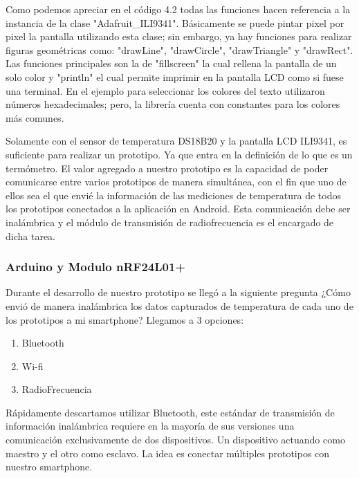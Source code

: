 \par \noindent
Como podemos apreciar en el código 4.2 todas las funciones hacen referencia a la instancia de la clase "Adafruit\_ILI9341". Básicamente se puede pintar pixel por pixel la pantalla utilizando esta clase; sin embargo, ya hay funciones para realizar figuras geométricas como: "drawLine", "drawCircle", "drawTriangle" y "drawRect". Las funciones principales  son la de "fillscreen" la cual rellena la pantalla de un solo color y "println" el cual permite imprimir en la pantalla LCD como si fuese una terminal. En el ejemplo para seleccionar los colores del texto utilizaron números hexadecimales; pero, la librería cuenta con constantes para los colores más comunes.

\par \noindent
Solamente con el sensor de temperatura DS18B20 y la pantalla LCD ILI9341, es suficiente para realizar un prototipo. Ya que entra en la definición de lo que es un termómetro. El valor agregado a nuestro prototipo es la capacidad de poder comunicarse entre varios prototipos de manera simultánea, con el fin que uno de ellos sea el que envié la información de las mediciones de temperatura de todos los prototipos conectados a la aplicación en Android. Esta comunicación debe ser inalámbrica y el módulo de transmisión de radiofrecuencia es el encargado de dicha tarea.

\subsubsection{Arduino y Modulo nRF24L01+}
\par 
Durante el desarrollo de nuestro prototipo se llegó a la siguiente pregunta ¿Cómo envió de manera inalámbrica los datos capturados de temperatura de cada uno de los prototipos a mi smartphone? Llegamos a 3 opciones:

\begin{enumerate}
	\item Bluetooth
	\item Wi-fi
	\item RadioFrecuencia
\end{enumerate} 

\par \noindent
Rápidamente descartamos utilizar Bluetooth, este estándar de transmisión de información inalámbrica requiere en la mayoría de sus versiones una comunicación exclusivamente de dos dispositivos. Un dispositivo actuando como maestro y el otro como esclavo. La idea es conectar múltiples prototipos con nuestro smartphone. 

